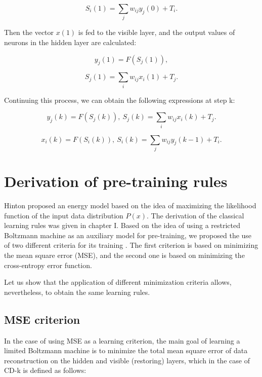 \begin{equation}
     S_i(1)=\sum_j w_{ij}y_j(0)+T_i.
\end{equation}

Then the vector $x(1)$ is fed to the visible layer, and the output values of neurons in the hidden layer are calculated:

\begin{equation}
     y_j(1)=F(S_j(1)),
\end{equation}

\begin{equation}
     S_j(1)=\sum_i w_{ij}x_i(1)+T_j.
\end{equation}

Continuing this process, we can obtain the following expressions at step k:

\begin{equation*}
     y_j(k)=F(S_j(k)),\ S_j(k)=\sum_i w_{ij}x_i(k)+T_j.
\end{equation*}

\begin{equation*}
     x_i(k)=F(S_i(k)),\ S_i(k)=\sum_j w_{ij}y_j(k-1)+T_i.
\end{equation*}

\section{Derivation of pre-training rules}

Hinton proposed an energy model based on the idea of maximizing the likelihood function of the input data distribution $P(x)$. The derivation of the classical learning rules was given in chapter I. Based on the idea of using a restricted Boltzmann machine as an auxiliary model for pre-training, we proposed the use of two different criteria for its training \cite{4-A}. The first criterion is based on minimizing the mean square error (MSE), and the second one is based on minimizing the cross-entropy error function.

Let us show that the application of different minimization criteria allows, nevertheless, to obtain the same learning rules.

\subsection{MSE criterion}

In the case of using MSE as a learning criterion, the main goal of learning a limited Boltzmann machine is to minimize the total mean square error of data reconstruction on the hidden and visible (restoring) layers, which in the case of CD-k is defined as follows:


